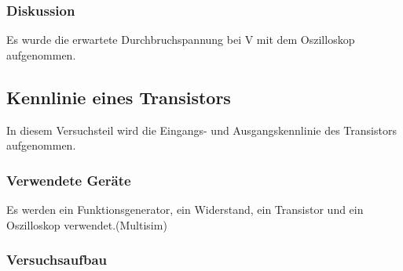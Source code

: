 \documentclass[12pt,a4paper]{article}
\begin{document}
\subsubsection{Diskussion}
Es wurde die erwartete Durchbruchspannung bei \unit[5,1]{V} mit dem Oszilloskop aufgenommen. 

\subsection{Kennlinie eines Transistors}
In diesem Versuchsteil wird die Eingangs- und Ausgangskennlinie des Transistors aufgenommen.
\subsubsection{Verwendete Geräte}

Es werden ein Funktionsgenerator, ein Widerstand, ein Transistor und ein Oszilloskop verwendet.(Multisim)

\subsubsection{Versuchsaufbau}
\end{document}
